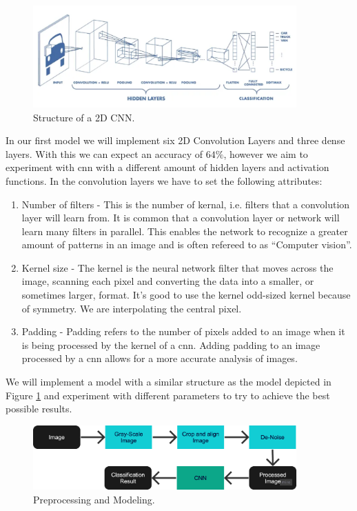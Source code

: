 \begin{figure}[h]
\centering
\includegraphics[width=0.9\textwidth]{images/conv2d2.png}
\caption{Structure of a 2D CNN. \cite{con2dart}}\label{fig:con2dart}
\end{figure}
In our first model we will implement six 2D Convolution Layers and three dense layers. With this we can expect an accuracy of $64\%$, however we aim to experiment with \acrshort{cnn} with a different amount of hidden layers and activation functions. In the convolution layers we have to set the following attributes: 
\begin{enumerate}
    \item Number of filters - This is the number of kernal, i.e. filters that a convolution layer will learn from. It is common that a convolution layer or network will learn many filters in parallel. This enables the network to recognize a greater amount of patterns in an image and is often refereed to as ``Computer vision''.
    \item Kernel size - The kernel is the neural network filter that moves across the image, scanning each pixel and converting the data into a smaller, or sometimes larger, format. It's good to use the kernel odd-sized kernel because of symmetry. We are interpolating the central pixel.
    \item Padding - Padding refers to the number of pixels added to an image when it is being processed by the kernel of a \acrshort{cnn}. Adding padding to an image processed by a \acrshort{cnn} allows for a more accurate analysis of images.
\end{enumerate}
We will implement a model with a similar structure as the model depicted in Figure \ref{fig:con2dart} and experiment with different parameters to try to achieve the best possible results. 

\begin{figure}[h]
\centering
\includegraphics[width=0.9\textwidth]{images/fer-preprocessing-modelling.png}
\caption{Preprocessing and Modeling.}\label{fig:prep-mod}
\end{figure}
